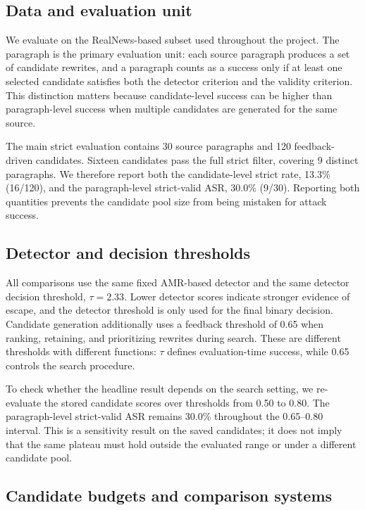 \subsection{Data and evaluation unit}

We evaluate on the RealNews-based subset used throughout the project. The paragraph is the primary evaluation unit: each source paragraph produces a set of candidate rewrites, and a paragraph counts as a success only if at least one selected candidate satisfies both the detector criterion and the validity criterion. This distinction matters because candidate-level success can be higher than paragraph-level success when multiple candidates are generated for the same source.

The main strict evaluation contains 30 source paragraphs and 120 feedback-driven candidates. Sixteen candidates pass the full strict filter, covering 9 distinct paragraphs. We therefore report both the candidate-level strict rate, 13.3\% (16/120), and the paragraph-level strict-valid ASR, 30.0\% (9/30). Reporting both quantities prevents the candidate pool size from being mistaken for attack success.

\subsection{Detector and decision thresholds}

All comparisons use the same fixed AMR-based detector and the same detector decision threshold, $\tau=2.33$. Lower detector scores indicate stronger evidence of escape, and the detector threshold is only used for the final binary decision. Candidate generation additionally uses a feedback threshold of 0.65 when ranking, retaining, and prioritizing rewrites during search. These are different thresholds with different functions: $\tau$ defines evaluation-time success, while 0.65 controls the search procedure.

To check whether the headline result depends on the search setting, we re-evaluate the stored candidate scores over thresholds from 0.50 to 0.80. The paragraph-level strict-valid ASR remains 30.0\% throughout the 0.65--0.80 interval. This is a sensitivity result on the saved candidates; it does not imply that the same plateau must hold outside the evaluated range or under a different candidate pool.

\subsection{Candidate budgets and comparison systems}

